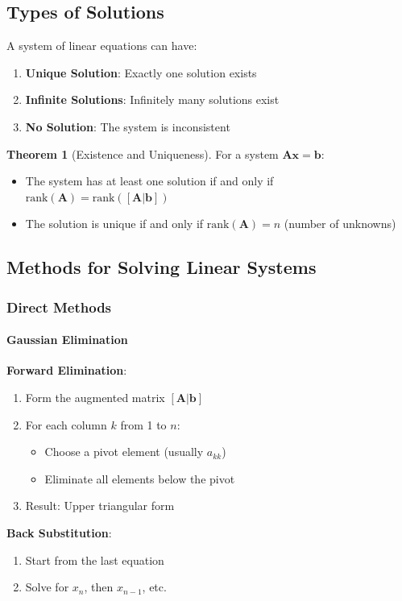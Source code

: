 \documentclass[12pt,a4paper]{article}
\theoremstyle{definition}
\newtheorem{theorem}{Theorem}[section]
\begin{document}
\subsection{Types of Solutions}

A system of linear equations can have:
\begin{enumerate}
\item \textbf{Unique Solution}: Exactly one solution exists
\item \textbf{Infinite Solutions}: Infinitely many solutions exist
\item \textbf{No Solution}: The system is inconsistent
\end{enumerate}

\begin{theorem}[Existence and Uniqueness]
For a system $\mathbf{Ax} = \mathbf{b}$:
\begin{itemize}
\item The system has at least one solution if and only if $\text{rank}(\mathbf{A}) = \text{rank}([\mathbf{A}|\mathbf{b}])$
\item The solution is unique if and only if $\text{rank}(\mathbf{A}) = n$ (number of unknowns)
\end{itemize}
\end{theorem}

\subsection{Methods for Solving Linear Systems}

\subsubsection{Direct Methods}

\paragraph{Gaussian Elimination}

\begin{tcolorbox}[enhanced,breakable,colback=examplecolor,colframe=blue!75!black,title=Algorithm: Gaussian Elimination]
\textbf{Forward Elimination}:
\begin{enumerate}
\item Form the augmented matrix $[\mathbf{A}|\mathbf{b}]$
\item For each column $k$ from 1 to $n$:
    \begin{itemize}
    \item Choose a pivot element (usually $a_{kk}$)
    \item Eliminate all elements below the pivot
    \end{itemize}
\item Result: Upper triangular form
\end{enumerate}

\textbf{Back Substitution}:
\begin{enumerate}
\item Start from the last equation
\item Solve for $x_n$, then $x_{n-1}$, etc.
\end{enumerate}
\end{tcolorbox}
\end{document}
